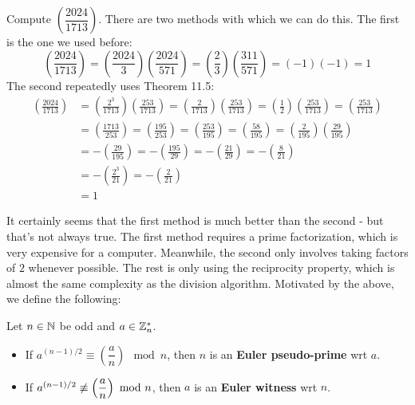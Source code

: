 \documentclass{article}
\begin{document}
\begin{xmp}[source=Primary Source Material]
    Compute $ \left( \dfrac{2024}{1713} \right) $. \vsp
    There are two methods with which we can do this.
    The first is the one we used before:
    \begin{equation*}
        \left( \frac{2024}{1713} \right) = \left( \frac{2024}{3} \right)
        \left( \frac{2024}{571} \right) = \left( \frac{2}{3} \right)
        \left( \frac{311}{571} \right) = (-1)(-1) = 1
    \end{equation*}
    The second repeatedly uses Theorem 11.5:
    \begin{align*}
        \left( \frac{2024}{1713} \right) & = \left( \frac{2^{3}}{1713} \right)
        \left( \frac{253}{1713} \right) = \left( \frac{2}{1713} \right)
        \left( \frac{253}{1713} \right) = \left( \frac{1}{2} \right)
        \left( \frac{253}{1713} \right) = \left( \frac{253}{1713} \right) \\
        & = \left( \frac{1713}{253} \right) = \left( \frac{195}{253} \right)
        = \left( \frac{253}{195} \right) = \left( \frac{58}{195} \right)
        = \left( \frac{2}{195} \right)\left( \frac{29}{195} \right) \\
        & = -\left( \frac{29}{195} \right) = -\left( \frac{195}{29} \right)
        = -\left( \frac{21}{29} \right) = -\left( \frac{8}{21} \right) \\
        & = -\left( \frac{2^{3}}{21} \right) = -\left( \frac{2}{21} \right) \\
        & = 1
    \end{align*}
\end{xmp}

It certainly seems that the first method is much better than the second - but that's not always
true. The first method requires a prime factorization, which is very expensive for a computer.
Meanwhile, the second only involves taking factors of $ 2 $ whenever possible.
The rest is only using the reciprocity property, which is almost the same complexity as the
division algorithm. \vsp
%
Motivated by the above, we define the following:

\begin{defn}
    Let $ n \in \mathbb{N} $ be odd and $ a \in \mathbb{Z}_{n}^{*} $.
    \begin{itemize}
        \item If $ a^{(n-1)/2} \equiv \left( \dfrac{a}{n} \right) \mod n $,
            then $ n $ is an \textbf{Euler pseudo-prime} wrt $ a $.
        \item If $ a^{(n-1)/2} \cnot\equiv \left( \dfrac{a}{n} \right) \mod n $,
            then $ a $ is an \textbf{Euler witness} wrt $ n $.
    \end{itemize}
\end{defn}
\end{document}
